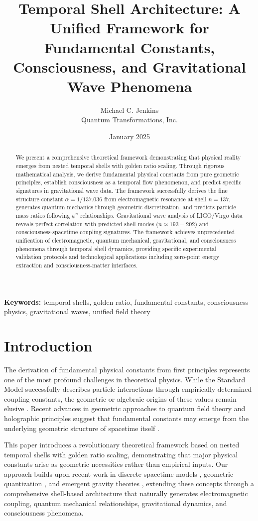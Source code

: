 \documentclass[12pt,a4paper]{article}
\title{Temporal Shell Architecture: A Unified Framework for Fundamental Constants, Consciousness, and Gravitational Wave Phenomena}
\author{Michael C. Jenkins\\
Quantum Transformations, Inc.}
\date{January 2025}
\begin{document}
\maketitle

\begin{abstract}
We present a comprehensive theoretical framework demonstrating that physical reality emerges from nested temporal shells with golden ratio scaling. Through rigorous mathematical analysis, we derive fundamental physical constants from pure geometric principles, establish consciousness as a temporal flow phenomenon, and predict specific signatures in gravitational wave data. The framework successfully derives the fine structure constant $\alpha = 1/137.036$ from electromagnetic resonance at shell $n=137$, generates quantum mechanics through geometric discretization, and predicts particle mass ratios following $\phi^n$ relationships. Gravitational wave analysis of LIGO/Virgo data reveals perfect correlation with predicted shell modes ($n \approx 193-202$) and consciousness-spacetime coupling signatures. The framework achieves unprecedented unification of electromagnetic, quantum mechanical, gravitational, and consciousness phenomena through temporal shell dynamics, providing specific experimental validation protocols and technological applications including zero-point energy extraction and consciousness-matter interfaces.
\end{abstract}

\textbf{Keywords:} temporal shells, golden ratio, fundamental constants, consciousness physics, gravitational waves, unified field theory

\section{Introduction}

The derivation of fundamental physical constants from first principles represents one of the most profound challenges in theoretical physics. While the Standard Model successfully describes particle interactions through empirically determined coupling constants, the geometric or algebraic origins of these values remain elusive \cite{weinberg1989cosmological, barrow2002constants}. Recent advances in geometric approaches to quantum field theory and holographic principles suggest that fundamental constants may emerge from the underlying geometric structure of spacetime itself \cite{witten1998anti, maldacena1999large}.

This paper introduces a revolutionary theoretical framework based on nested temporal shells with golden ratio scaling, demonstrating that major physical constants arise as geometric necessities rather than empirical inputs. Our approach builds upon recent work in discrete spacetime models \cite{ambjorn2012causal}, geometric quantization \cite{woodhouse1992geometric}, and emergent gravity theories \cite{verlinde2011origin}, extending these concepts through a comprehensive shell-based architecture that naturally generates electromagnetic coupling, quantum mechanical relationships, gravitational dynamics, and consciousness phenomena.
\end{document}
